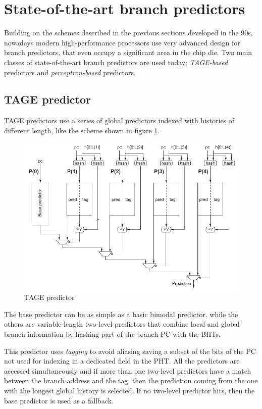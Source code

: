 \section{State-of-the-art branch predictors}
Building on the schemes described in the previous sections developed in the 90s, nowadays modern high-performance processors use very advanced design for branch predictors, that even occupy a significant area in the chip die. Two main classes of state-of-the-art branch predictors are used today: \emph{\acs{TAGE}-based} predictors and \emph{perceptron-based} predictors.

\subsection{\acl{TAGE} predictor}
\acf{TAGE} predictors \cite{seznec06} use a series of global predictors indexed with histories of different length, like the scheme shown in figure \ref{fig:tage}.
\begin{figure}[hbtp]
  \centering
  \includegraphics[width=\textwidth]{img/tage.pdf}
  \caption{\ac{TAGE} predictor \cite[p.~188]{hennessy17}}
  \label{fig:tage}
\end{figure}
The base predictor can be as simple as a basic bimodal predictor, while the others are variable-length two-level predictors that combine local and global branch information by hashing part of the branch \ac{PC} with the \acp{BHT}.

This predictor uses \emph{tagging} to avoid aliasing saving a subset of the bits of the \ac{PC} not used for indexing in a dedicated field in the \ac{PHT}. All the predictors are accessed simultaneously and if more than one two-level predictors have a match between the branch address and the tag, then the prediction coming from the one with the longest global history is selected. If no two-level predictor hits, then the base predictor is used as a fallback.

